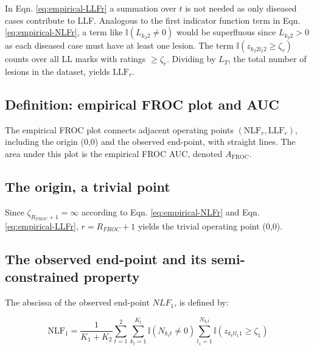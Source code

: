 \documentclass[
]{book}
\begin{document}
In Eqn. \eqref{eq:empirical-LLFr} a summation over \(t\) is not needed as only diseased cases contribute to LLF. Analogous to the first indicator function term in Eqn. \eqref{eq:empirical-NLFr}, a term like \(\mathbb{I} \left ( L_{k_2 2} \neq 0 \right )\) would be superfluous since \(L_{k_2 2} > 0\) as each diseased case must have at least one lesion. The term \(\mathbb{I} \left ( z_{k_2 2 l_2 2} \geq \zeta_r \right )\) counts over all LL marks with ratings \(\geq \zeta_r\). Dividing by \(L_T\), the total number of lesions in the dataset, yields \(\text{LLF}_r\).

\hypertarget{empirical-definition-empirical-auc-froc}{%
\subsection{Definition: empirical FROC plot and AUC}\label{empirical-definition-empirical-auc-froc}}

The empirical FROC plot connects adjacent operating points \(\left (\text{NLF}_r, \text{LLF}_r \right )\), including the origin (0,0) and the observed end-point, with straight lines. The area under this plot is the empirical FROC AUC, denoted \(A_{\text{FROC}}\).

\hypertarget{empirical-origin-trivial-point}{%
\subsection{The origin, a trivial point}\label{empirical-origin-trivial-point}}

Since \(\zeta_{R_{FROC}+1} = \infty\) according to Eqn. \eqref{eq:empirical-NLFr} and Eqn. \eqref{eq:empirical-LLFr}, \(r = R_{FROC}+1\) yields the trivial operating point (0,0).

\hypertarget{empirical-end-point}{%
\subsection{The observed end-point and its semi-constrained property}\label{empirical-end-point}}

The abscissa of the observed end-point \(NLF_1\), is defined by:

\begin{equation}
\text{NLF}_1 = \frac{1}{K_1+K_2} \sum_{t=1}^{2} \sum_{k_t=1}^{K_t} \mathbb{I} \left ( N_{k_t t} \neq 0 \right ) \sum_{l_1=1}^{N_{k_t t}} \mathbb{I} \left ( z_{k_t t l_1 1} \geq \zeta_1 \right ) 
\label{eq:empirical-NLF11}
\end{equation}
\end{document}

